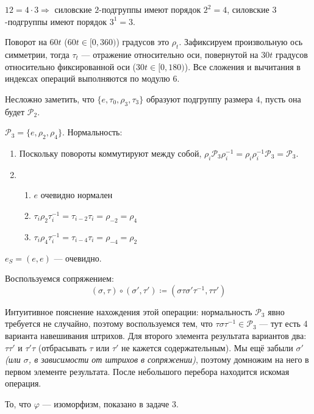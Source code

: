 \begin{solution}
    \(12 = 4 \cdot 3 \Rightarrow\) силовские \(2\)-подгруппы имеют порядок \(2^2 = 4\), силовские \(3\)-подгруппы имеют порядок \(3^1 = 3\).

    \begin{obozn}
        Поворот на \(60t\) (\(60t \in [0, 360)\)) градусов это \(\rho_t\). Зафиксируем произвольную ось симметрии, тогда \(\tau_t\) --- отражение относительно оси, повернутой на \(30t\) градусов относительно фиксированной оси (\(30t \in [0, 180)\)). Все сложения и вычитания в индексах операций выполняются по модулю \(6\).
    \end{obozn}

    Несложно заметить, что \(\{e, \tau_0, \rho_3, \tau_3\}\) образуют подгруппу размера \(4\), пусть она будет \(\mathcal{P}_2\).

    \(\mathcal{P}_3 = \{e, \rho_2, \rho_4\}\). Нормальность:
    \begin{enumerate}
        \item Поскольку повороты коммутируют между собой, \(\rho_i \mathcal{P}_3 \rho_i^{-1} = \rho_i\rho_i^{-1} \mathcal{P}_3 = \mathcal{P}_3\).
        \item \begin{enumerate}
                  \item \(e\) очевидно нормален
                  \item \(\tau_i \rho_2 \tau_i^{-1} = \tau_{i - 2} \tau_i = \rho_{ -2} = \rho_4\)
                  \item \(\tau_i \rho_4 \tau_i^{-1} = \tau_{i - 4} \tau_i = \rho_{ -4} = \rho_2\)
              \end{enumerate}
    \end{enumerate}

    \(e_S = (e, e)\) --- очевидно.

    Воспользуемся сопряжением:
    \[(\sigma, \tau) \circ (\sigma', \tau') \coloneqq (\sigma \tau \sigma' \tau^{-1}, \tau \tau')\]

    Интуитивное пояснение нахождения этой операции: нормальность \(\mathcal{P}_3\) явно требуется не случайно, поэтому воспользуемся тем, что \(\tau \sigma \tau^{-1} \in \mathcal{P}_3\) --- тут есть 4 варианта навешивания штрихов. Для второго элемента результата вариантов два: \(\tau \tau'\) и \(\tau' \tau\) (отбрасывать \(\tau\) или \(\tau'\) не кажется содержательным). Мы ещё забыли \(\sigma'\) \textit{(или \(\sigma\), в зависимости от штрихов в сопряжении)}, поэтому домножим на него в первом элементе результата. После небольшого перебора находится искомая операция.

    \begin{remark}
        То, что \(\varphi\) --- изоморфизм, показано в задаче 3.
    \end{remark}
\end{solution}

